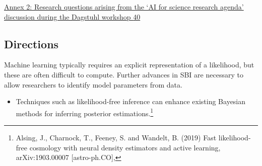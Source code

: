 \protect\hyperlink{_Toc121762051}{Annex 2: Research questions arising
from the `AI for science research agenda' discussion during the Dagstuhl
workshop \protect\hyperlink{_Toc121762051}{40}}

\hypertarget{introduction-bridging-data-driven-and-mechanistic-modelling}{%



\hypertarget{snapshots-of-ai-in-science}{%

\hypertarget{directions}{%
\subsection{Directions}\label{directions}}

Machine learning typically requires an explicit representation of a
likelihood, but these are often difficult to compute. Further advances
in SBI are necessary to allow researchers to identify model parameters
from data.

\begin{itemize}
\item
  Techniques such as likelihood-free inference can enhance existing
  Bayesian methods for inferring posterior estimations.\footnote{Alsing,
    J., Charnock, T., Feeney, S. and Wandelt, B. (2019) Fast
    likelihood-free cosmology with neural density estimators and active
    learning, arXiv:1903.00007 {[}astro-ph.CO{]},

}
\end{itemize}}}

